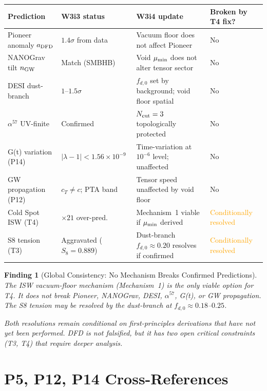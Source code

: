 \documentclass[11pt]{article}
\newtheorem{finding}{Finding}
\newcommand{\ee}[1]{\times 10^{#1}}
\newcommand{\lambdaone}{|\lambda-1|}
\newcommand{\DFD}{{\rm DFD}}
\newcommand{\mumin}{\mu_{\rm min}}
\begin{document}
\begin{center}
\small
\begin{tabular}{p{3.5cm}p{2.5cm}p{4cm}p{3cm}}
\toprule
Prediction & W3i3 status & W3i4 update & Broken by T4 fix? \\
\midrule
Pioneer anomaly $a_{\DFD}$ &
$1.4\sigma$ from data &
Vacuum floor does not affect Pioneer &
No \\
NANOGrav tilt $n_{\rm GW}$ &
Match (SMBHB) &
Void $\mumin$ does not alter tensor sector &
No \\
DESI dust-branch &
$1$--$1.5\sigma$ &
$f_{d,0}$ set by background; void floor spatial &
No \\
$\alpha^{57}$ UV-finite &
Confirmed &
$N_{\rm cut} = 3$ topologically protected &
No \\
G(t) variation (P14) &
$\lambdaone < 1.56\ee{-9}$ &
Time-variation at $10^{-6}$ level; unaffected &
No \\
GW propagation (P12) &
$c_T \neq c$; PTA band &
Tensor speed unaffected by void floor &
No \\
Cold Spot ISW (T4) &
$\times 21$ over-pred. &
Mechanism~1 viable if $\mumin$ derived &
\textcolor{orange}{Conditionally resolved} \\
S8 tension (T3) &
Aggravated ($S_8=0.889$) &
Dust-branch $f_{d,0} \approx 0.20$ resolves if confirmed &
\textcolor{orange}{Conditionally resolved} \\
\bottomrule
\end{tabular}
\end{center}

\begin{finding}[Global Consistency: No Mechanism Breaks Confirmed Predictions]\label{find:global}
The ISW vacuum-floor mechanism (Mechanism~1) is the only viable option for
T4.  It does not break Pioneer, NANOGrav, DESI, $\alpha^{57}$, G(t), or
GW propagation.  The S8 tension may be resolved by the dust-branch at
$f_{d,0} \approx 0.18$--$0.25$.

Both resolutions remain \textit{conditional} on first-principles derivations
that have not yet been performed.  DFD is not falsified, but it has two
open critical constraints (T3, T4) that require deeper analysis.
\end{finding}

\section{P5, P12, P14 Cross-References}
\label{sec:cross-refs}
\end{document}

